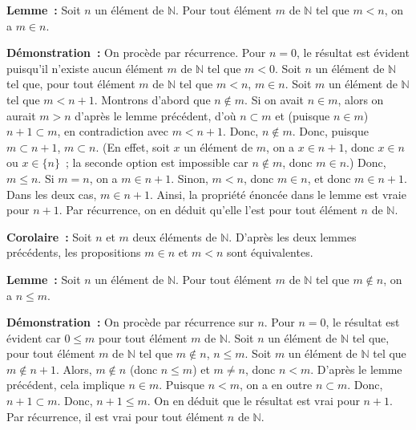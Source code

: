   \done 

\medskip

\noindent\textbf{Lemme :} 
    Soit $n$ un élément de $\mathbb{N}$. 
    Pour tout élément $m$ de $\mathbb{N}$ tel que $m < n$, on a $m \in n$.

\medskip

\noindent\textbf{Démonstration :} 
    On procède par récurrence. 
    Pour $n=0$, le résultat est évident puisqu'il n'existe aucun élément $m$ de $\mathbb{N}$ tel que $m < 0$.
    Soit $n$ un élément de $\mathbb{N}$ tel que, pour tout élément $m$ de $\mathbb{N}$ tel que $m < n$, $m \in n$. 
    Soit $m$ un élément de $\mathbb{N}$ tel que $m < n+1$. 
    Montrons d'abord que $n \notin m$. 
    Si on avait $n \in m$, alors on aurait $m > n$ d'après le lemme précédent, d'où $n \subset m$ et (puisque $n \in m$) $n+1 \subset m$, en contradiction avec $m < n+1$. 
    Donc, $n \notin m$. 
    Donc, puisque $m \subset n+1$, $m \subset n$. 
    (En effet, soit $x$ un élément de $m$, on a $x \in n+1$, donc $x \in n$ ou $x \in \lbrace n \rbrace$ ; la seconde option est impossible car $n \notin m$, donc $m \in n$.)
    Donc, $m \leq n$. 
    Si $m = n$, on a $m \in n+1$. 
    Sinon, $m < n$, donc $m \in n$, et donc $m \in n+1$. 
    Dans les deux cas, $m \in n+1$. 
    Ainsi, la propriété énoncée dans le lemme est vraie pour $n+1$. 
    Par récurrence, on en déduit qu'elle l'est pour tout élément $n$ de $\mathbb{N}$.

   \done 

\medskip

\noindent\textbf{Corolaire :} 
    Soit $n$ et $m$ deux éléments de $\mathbb{N}$. 
    D'après les deux lemmes précédents, les propositions $m \in n$ et $m < n$ sont équivalentes.

\medskip

\noindent\textbf{Lemme :} 
    Soit $n$ un élément de $\mathbb{N}$. 
    Pour tout élément $m$ de $\mathbb{N}$ tel que $m \notin n$, on a $n \leq m$.

\medskip

\noindent\textbf{Démonstration :} 
    On procède par récurrence sur $n$. 
    Pour $n=0$, le résultat est évident car $0 \leq m$ pour tout élément $m$ de $\mathbb{N}$.
    Soit $n$ un élément de $\mathbb{N}$ tel que, pour tout élément $m$ de $\mathbb{N}$ tel que $m \notin n$, $n \leq m$. 
    Soit $m$ un élément de $\mathbb{N}$ tel que $m \notin n+1$. 
    Alors, $m \notin n$ (donc $n \leq m$) et $m \neq n$, donc $n < m$. 
    D'après le lemme précédent, cela implique $n \in m$. 
    Puisque $n < m$, on a en outre $n \subset m$. 
    Donc, $n+1 \subset m$. 
    Donc, $n+1 \leq m$. 
    On en déduit que le résultat est vrai pour $n+1$.
    Par récurrence, il est vrai pour tout élément $n$ de $\mathbb{N}$. 

